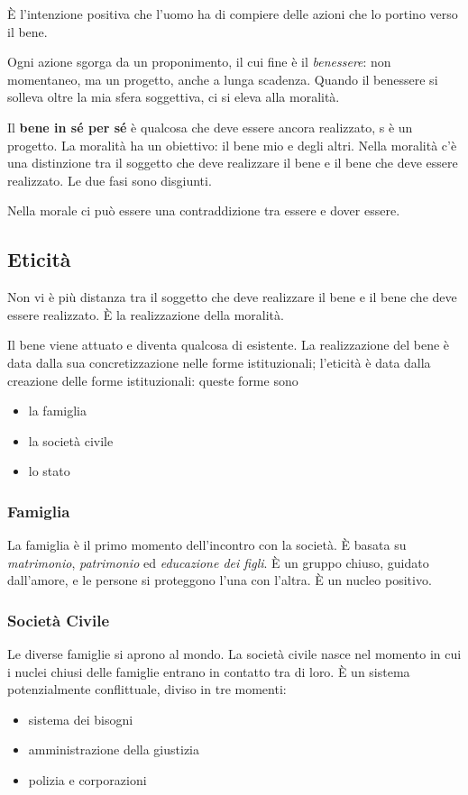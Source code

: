\documentclass[a4paper, twoside, titlepage]{book}
\begin{document}
È l'intenzione positiva che l'uomo ha di compiere delle azioni che lo portino verso il bene.

Ogni azione sgorga da un proponimento, il cui fine è il \textit{benessere}: non momentaneo, ma un progetto, anche a lunga scadenza.
Quando il benessere si solleva oltre la mia sfera soggettiva, ci si eleva alla moralità.

Il \textbf{bene in sé per sé} è qualcosa che deve essere ancora realizzato,  s è un progetto. La moralità ha un obiettivo: il bene mio e degli altri.
Nella moralità c'è una distinzione tra il soggetto che deve realizzare il bene e il bene che deve essere realizzato. Le due fasi sono disgiunti.

Nella morale ci può essere una contraddizione tra essere e dover essere.

\subsection{Eticità}

Non vi è più distanza tra il soggetto che deve realizzare il bene e il bene che deve essere realizzato. È la realizzazione della moralità.

Il bene viene attuato e diventa qualcosa di esistente.
La realizzazione del bene è data dalla sua concretizzazione nelle forme istituzionali; l'eticità è data dalla creazione delle forme istituzionali: queste forme sono
\begin{itemize}
\item la famiglia
\item la società civile
\item lo stato
\end{itemize}

\subsubsection{Famiglia}
La famiglia è il primo momento dell'incontro con la società. È basata su \textit{matrimonio}, \textit{patrimonio} ed \textit{educazione dei figli}.
È un gruppo chiuso, guidato dall'amore, e le persone si proteggono l'una con l'altra. È un nucleo positivo.

\subsubsection{Società Civile}
Le diverse famiglie si aprono al mondo. La società civile nasce nel momento in cui i nuclei chiusi delle famiglie entrano in contatto tra di loro. È un sistema potenzialmente conflittuale, diviso in tre momenti:
\begin{itemize}
\item sistema dei bisogni
\item amministrazione della giustizia
\item polizia e corporazioni
\end{itemize}
\end{document}
